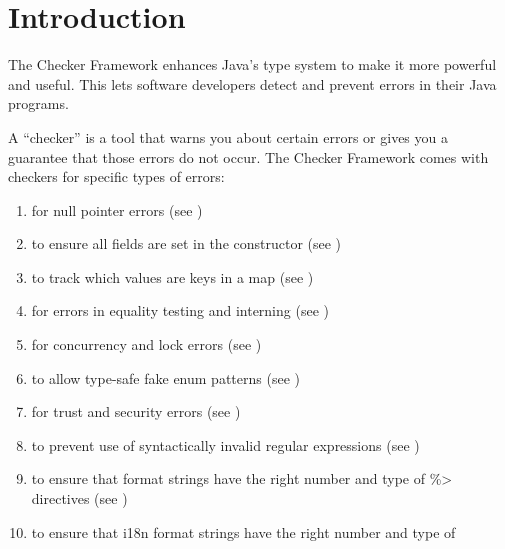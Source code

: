 \htmlhr
\chapter{Introduction\label{introduction}}

The Checker Framework enhances Java's type system to make it more powerful
and useful.
This lets software developers detect and
prevent errors in their Java programs.

A ``checker'' is a tool that warns you about certain errors or gives you a
guarantee that those errors do not occur.
The Checker Framework comes with checkers for specific types of errors:

\begin{enumerate}

\item
   for null pointer errors
  (see )
\item
   to ensure all
  fields are set in the constructor (see
  )
\item
   to track which values are
  keys in a map (see )
\item
   for errors in equality
  testing and interning (see )
\item
   for concurrency and lock errors
  (see )
\item
   to allow type-safe fake enum
  patterns (see )
\item
   for trust and security errors
  (see )
\item
   to prevent use of syntactically
  invalid regular expressions (see )
\item
   to ensure that format
  strings have the right number and type of \<\%> directives (see
  )
\item
  to ensure that i18n format strings have the right number and type of

\end{enumerate}
